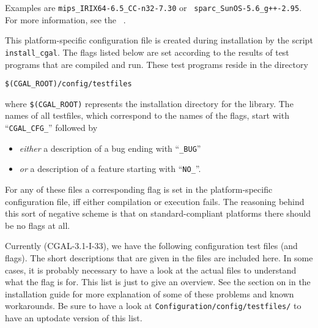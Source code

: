 \noindent Examples are \texttt{mips\_IRIX64-6.5\_CC-n32-7.30} or {\tt
  sparc\_SunOS-5.6\_g++-2.95}. For more information, see the \cgal\ 
.
\ccIndexSubitemEnd{flag}{for OS \& compiler}

This platform-specific configuration file is created during
installation by the script \texttt{install\_cgal}. The flags listed below
are set according to the results of test programs that are compiled and run.
These test programs reside in the directory
\begin{center}
\verb|$(CGAL_ROOT)/config/testfiles|
\end{center}
where \verb|$(CGAL_ROOT)| represents the installation directory for the library.
The names of all testfiles, which correspond to the names of the flags, 
\ccIndexSubitem{workaround flags}{names}
start with ``\texttt{CGAL\_CFG\_}'' followed by
\begin{itemize}
\item \textit{either} a description of a bug ending with
  ``\texttt{\_BUG}''
\item \textit{or} a description of a feature starting with
  ``\texttt{NO\_}''.
\end{itemize}
For any of these files a corresponding flag is set in the 
platform-specific configuration file, iff either compilation or execution
fails. The reasoning behind this sort of negative scheme is that on
standard-compliant platforms there should be no flags at all.


\noindent Currently (CGAL-3.1-I-33), we have the following configuration
test files (and flags). The short descriptions that are given in the files are 
included here. In some cases, it is probably necessary to have a look at the
actual files to understand what the flag is for. This list is just to
give an overview.  See the section on
 in the installation guide
for more explanation of some of these problems and known workarounds. 
Be sure to have a look at \texttt{Configuration/config/testfiles/} to have an
uptodate version of this list.

